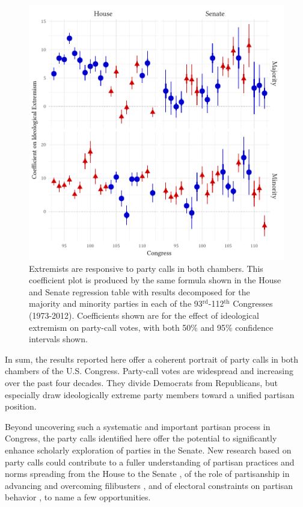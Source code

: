 \documentclass[12pt]{article}
\begin{document}
\begin{figure}[!htbp]
\centering
\includegraphics{both-chambers-figure2.pdf}
\caption{Extremists are responsive to party calls in both chambers.
This coefficient plot is produced by the same formula shown in the House and Senate regression table with results decomposed for the majority and minority parties in each of the 93$^{\text{rd}}$-112$^{\text{th}}$ Congresses (1973-2012). Coefficients shown are for the effect of ideological extremism on party-call votes, with both 50\% and 95\% confidence intervals shown.
\label{fig-extremism-responsiveness}}
\end{figure}

In sum, the results reported here offer a coherent portrait of party calls in both chambers of the U.S. Congress. Party-call votes are widespread and increasing over the past four decades. They divide Democrats from Republicans, but especially draw ideologically extreme party members toward a unified partisan position.

Beyond uncovering such a systematic and important partisan process in Congress, the party calls identified here offer the potential to significantly enhance scholarly exploration of parties in the Senate. New research based on party calls could contribute to a fuller understanding of partisan practices and norms spreading from the House to the Senate \citep[e.g.,][]{Theriault:2013}, of the role of partisanship in advancing and overcoming filibusters \citep[e.g.,][]{Wawro:2004}, and of electoral constraints on partisan behavior \citep[e.g.,][]{Levitt:1996}, to name a few opportunities.
\end{document}
